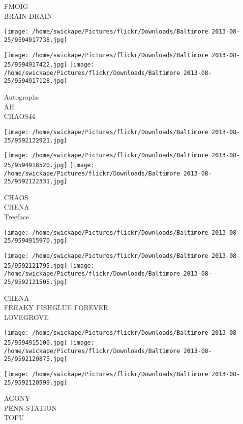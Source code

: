 \documentclass[10pt,letterpaper]{article}
\begin{document}
FMOIG\\
BRAIN DRAIN
\pagebreak

\texttt{[image: /home/swickape/Pictures/flickr/Downloads/Baltimore 2013-08-25/9594917738.jpg]}

\vspace{0.25in}
\texttt{[image: /home/swickape/Pictures/flickr/Downloads/Baltimore 2013-08-25/9594917422.jpg]}
\texttt{[image: /home/swickape/Pictures/flickr/Downloads/Baltimore 2013-08-25/9594917128.jpg]}

Autographs\\
AH\\
CHAOS44
\pagebreak

\texttt{[image: /home/swickape/Pictures/flickr/Downloads/Baltimore 2013-08-25/9592122921.jpg]}

\vspace{0.25in}
\texttt{[image: /home/swickape/Pictures/flickr/Downloads/Baltimore 2013-08-25/9594916520.jpg]}
\texttt{[image: /home/swickape/Pictures/flickr/Downloads/Baltimore 2013-08-25/9592122331.jpg]}

CHAOS\\
CHENA\\
Treeface
\pagebreak

\texttt{[image: /home/swickape/Pictures/flickr/Downloads/Baltimore 2013-08-25/9594915970.jpg]}

\vspace{0.25in}
\texttt{[image: /home/swickape/Pictures/flickr/Downloads/Baltimore 2013-08-25/9592121795.jpg]}
\texttt{[image: /home/swickape/Pictures/flickr/Downloads/Baltimore 2013-08-25/9592121505.jpg]}

CHENA\\
FREAKY FISHGLUE FOREVER\\
LOVEGROVE
\pagebreak

\texttt{[image: /home/swickape/Pictures/flickr/Downloads/Baltimore 2013-08-25/9594915100.jpg]}
\texttt{[image: /home/swickape/Pictures/flickr/Downloads/Baltimore 2013-08-25/9592120875.jpg]}

\texttt{[image: /home/swickape/Pictures/flickr/Downloads/Baltimore 2013-08-25/9592120599.jpg]}

AGONY\\
PENN STATION\\
TOFU
\pagebreak
\end{document}
